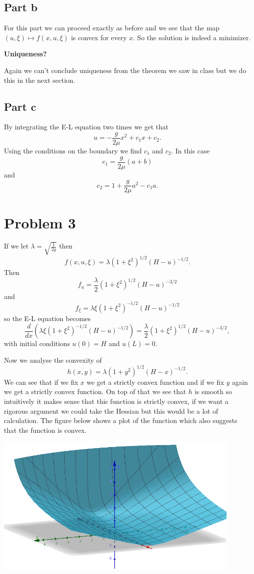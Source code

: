 \documentclass{article}
\begin{document}
\subsection{Part b}
For this part we can proceed exactly as before and we see that the map
$(u,\xi)\mapsto f(x,u,\xi)$ is convex for every $x$. So the solution is indeed
a minimizer.

\textbf{Uniqueness?}

Again we can't conclude uniqueness from the theorem we saw in class but we do this in the next section.
\subsection{Part c}
By integrating the E-L equation two times we get that
\[
	u=-\frac{g}{2\mu} x^2 +c_1x+c_2.
\]
Using the conditions on the boundary we find $c_1$ and $c_2$. In this case
\[
	c_1=\frac{g}{2\mu}(a+b)
\]
and
\[
	c_2=1+\frac{g}{2\mu}a^2-c_1a.
\]
\section{Problem 3}
If we let $\lambda=\sqrt{\frac{1}{2g}}$ then
\[
	f(x,u,\xi)=\lambda(1+\xi^2)^{1/2}(H-u)^{-1/2}.
\]
Then
\[
	f_u=\frac{\lambda}{2}(1+\xi^2)^{1/2}(H-u)^{-3/2}
\]
and
\[
	f_\xi=\lambda\xi(1+\xi^2)^{-1/2}(H-u)^{-1/2}
\]
so the E-L equation becomes
\[
	\frac{d}{dx}(\lambda\xi(1+\xi^2)^{-1/2}(H-u)^{-1/2})
	=\frac{\lambda}{2}(1+\xi^2)^{1/2}(H-u)^{-3/2},
\]
with initial conditions $u(0)=H$ and $u(L)=0$.

Now we analyse the convexity of
\[
	h(x,y)=\lambda (1+y^2)^{1/2}(H-x)^{-1/2}.
\]
We can see that if we fix $x$ we get a strictly convex function and if we fix
$y$ again we get a strictly convex function. On top of that we see
that $h$ is smooth so intuitively it makes sense that this function
is strictly convex, if we want a rigorous argument we could take the Hessian
but this would be a lot of calculation. The figure below shows a plot of the
function which also suggests that the function is convex.

\includegraphics[width=0.9\textwidth]{convex.png}
\end{document}
